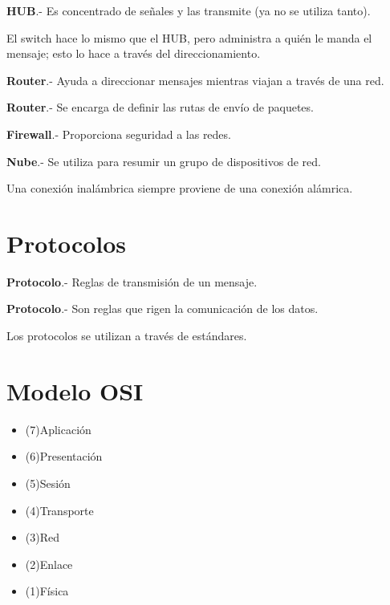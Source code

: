 \documentclass{article}
\begin{document}
\textbf{HUB}.- Es concentrado de señales y las transmite (ya no se utiliza tanto).
\vspace{1em}

El switch hace lo mismo que el HUB, pero administra a quién le manda el mensaje;
esto lo hace a través del direccionamiento.
\vspace{1em}

\textbf{Router}.- Ayuda a direccionar mensajes mientras viajan a través de una red.

\textbf{Router}.- Se encarga de definir las rutas de envío de paquetes.
\vspace{1em}

\vspace{1em}

\textbf{Firewall}.- Proporciona seguridad a las redes.
\vspace{1em}

\textbf{Nube}.- Se utiliza para resumir un grupo de dispositivos de red.
\vspace{1em}

Una conexión inalámbrica siempre proviene de una conexión alámrica.

\section{Protocolos}

\textbf{Protocolo}.- Reglas de transmisión de un mensaje.
\vspace{1em}

\textbf{Protocolo}.- Son reglas que rigen la comunicación de los datos.
\vspace{1em}

Los protocolos se utilizan a través de estándares.

\section{Modelo OSI}

\begin{itemize}
	\item
	(7)Aplicación
	\item
	(6)Presentación
	\item
	(5)Sesión
	\item
	(4)Transporte
	\item
	(3)Red
	\item
	(2)Enlace
	\item
	(1)Física
\end{itemize}
\vspace{1em}
\end{document}
